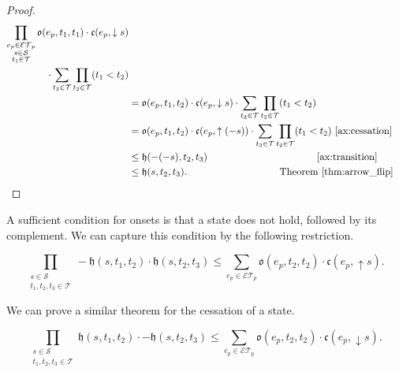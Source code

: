 \begin{proof}
	\begin{align*}
		\prod_{\substack{e_p \in \mathcal{ET}_p                                                               \\ s \in \mathcal{S} \\ t_1 \in \mathcal{T}}}\mathfrak{o}(e_p, t_1, t_1) \cdot \mathfrak{c}(e_p, \downarrow s)\\    \cdot
		\sum_{t_3 \in \mathcal{T}} \prod_{t_2 \in \mathcal{T}} (t_1 < t_2)                                    \\
		 & = \mathfrak{o}(e_p, t_1, t_2) \cdot \mathfrak{c}(e_p, \downarrow s)               \cdot
		\sum_{t_3 \in \mathcal{T}} \prod_{t_2 \in \mathcal{T}} (t_1 < t_2)                                    \\
		 & = \mathfrak{o}(e_p, t_1, t_2) \cdot \mathfrak{c}(e_p, \uparrow (-s))  \cdot
		\sum_{t_3 \in \mathcal{T}} \prod_{t_2 \in \mathcal{T}} (t_1 < t_2)         \text{~\ref{ax:cessation}} \\
		 & \leq \mathfrak{h}(-(-s), t_2, t_3) \hspace{0.31 \textwidth}   \text{~\ref{ax:transition}}          \\
		 & \leq  \mathfrak{h}(s, t_2, t_3).  \hspace{0.27 \textwidth }  \text{Theorem~\ref{thm:arrow_flip}}
	\end{align*}
\end{proof}

A sufficient condition for onsets is that a state does not hold, followed by its complement. We can capture this condition by the following restriction.

\begin{equation}\label{ax:transition_2}
	\prod_{\substack{s \in \mathcal{S} \\ t_1, t_2, t_3 \in \mathcal{T}}}- \mathfrak{h}(s, t_1, t_2) \cdot \mathfrak{h}(s, t_2, t_3) \leq
	\sum_{e_p \in \mathcal{ET}_p} \mathfrak{o}(e_p, t_2, t_2) \cdot \mathfrak{c}(e_p, \uparrow s).
\end{equation}

We can prove a similar theorem for the cessation of a state.

\begin{theorem}\label{thm:cessation_3}
	\begin{equation}
		\prod_{\substack{s \in \mathcal{S} \\ t_1, t_2, t_3 \in \mathcal{T}}}    \mathfrak{h}(s, t_1, t_2) \cdot - \mathfrak{h}(s, t_2, t_3) \leq
		\sum_{e_p \in \mathcal{ET}_p} \mathfrak{o}(e_p, t_2, t_2) \cdot \mathfrak{c}(e_p, \downarrow s).
	\end{equation}

\end{theorem}

